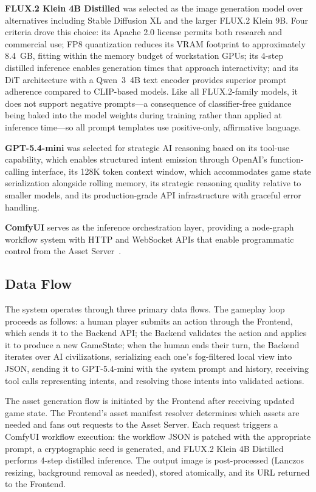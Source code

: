 \documentclass[conference]{IEEEtran}
\begin{document}
\textbf{FLUX.2 Klein 4B Distilled} was selected as the image generation
model over alternatives including Stable Diffusion XL and the larger
FLUX.2 Klein 9B. Four criteria drove this choice: its Apache 2.0 license
permits both research and commercial use; FP8 quantization reduces its VRAM
footprint to approximately 8.4~GB, fitting within the memory budget of
workstation GPUs; its 4-step distilled inference enables generation times
that approach interactivity; and its DiT architecture with a Qwen~3~4B text
encoder provides superior prompt adherence compared to CLIP-based models.
Like all FLUX.2-family models, it does not support negative prompts---a
consequence of classifier-free guidance being baked into the model weights
during training rather than applied at inference time---so all prompt
templates use positive-only, affirmative language.

\textbf{GPT-5.4-mini} was selected for strategic AI reasoning based on its
tool-use capability, which enables structured intent emission through
OpenAI's function-calling interface, its 128K token context window, which
accommodates game state serialization alongside rolling memory, its
strategic reasoning quality relative to smaller models, and its
production-grade API infrastructure with graceful error handling.

\textbf{ComfyUI} serves as the inference orchestration layer, providing a
node-graph workflow system with HTTP and WebSocket APIs that enable
programmatic control from the Asset Server~\cite{comfyui2023}.

\subsection{Data Flow}

The system operates through three primary data flows. The gameplay loop
proceeds as follows: a human player submits an action through the Frontend,
which sends it to the Backend API; the Backend validates the action and
applies it to produce a new GameState; when the human ends their turn, the
Backend iterates over AI civilizations, serializing each one's fog-filtered
local view into JSON, sending it to GPT-5.4-mini with the system prompt and
history, receiving tool calls representing intents, and resolving those
intents into validated actions.

The asset generation flow is initiated by the Frontend after receiving
updated game state. The Frontend's asset manifest resolver determines which
assets are needed and fans out requests to the Asset Server. Each request
triggers a ComfyUI workflow execution: the workflow JSON is patched with
the appropriate prompt, a cryptographic seed is generated, and FLUX.2
Klein 4B Distilled performs 4-step distilled inference. The output image is
post-processed (Lanczos resizing, background removal as needed), stored
atomically, and its URL returned to the Frontend.
\end{document}
